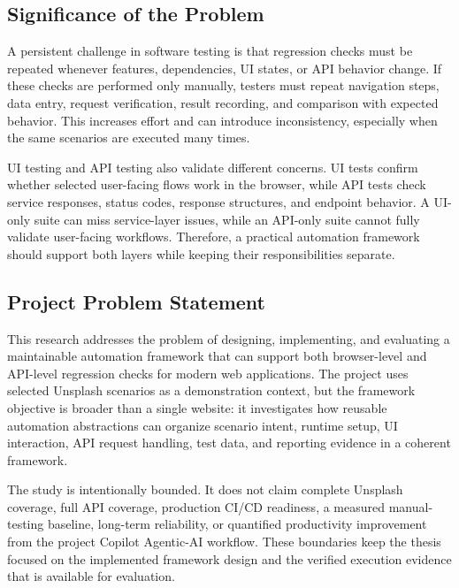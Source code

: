 \subsection{Significance of the Problem}
\label{subsec:ch1-significance-of-problem}

A persistent challenge in software testing is that regression checks must be repeated whenever features, dependencies, UI states, or API behavior change. If these checks are performed only manually, testers must repeat navigation steps, data entry, request verification, result recording, and comparison with expected behavior. This increases effort and can introduce inconsistency, especially when the same scenarios are executed many times.

UI testing and API testing also validate different concerns. UI tests confirm whether selected user-facing flows work in the browser, while API tests check service responses, status codes, response structures, and endpoint behavior. A UI-only suite can miss service-layer issues, while an API-only suite cannot fully validate user-facing workflows. Therefore, a practical automation framework should support both layers while keeping their responsibilities separate.

\subsection{Project Problem Statement}
\label{subsec:ch1-project-problem-statement}

This research addresses the problem of designing, implementing, and evaluating a maintainable automation framework that can support both browser-level and API-level regression checks for modern web applications. The project uses selected Unsplash scenarios as a demonstration context, but the framework objective is broader than a single website: it investigates how reusable automation abstractions can organize scenario intent, runtime setup, UI interaction, API request handling, test data, and reporting evidence in a coherent framework.

The study is intentionally bounded. It does not claim complete Unsplash coverage, full API coverage, production CI/CD readiness, a measured manual-testing baseline, long-term reliability, or quantified productivity improvement from the project Copilot Agentic-AI workflow. These boundaries keep the thesis focused on the implemented framework design and the verified execution evidence that is available for evaluation.

